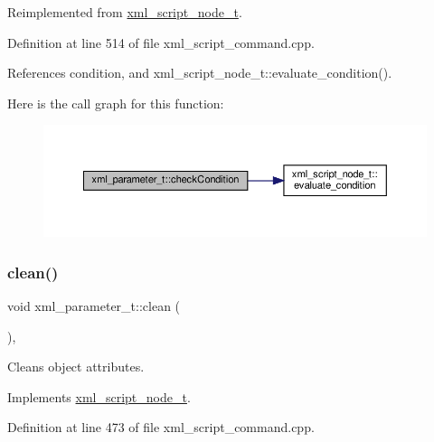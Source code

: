 Reimplemented from \hyperlink{classxml__script__node__t_a13fbe7caa7bed64ab3cc25d51392523d}{xml\+\_\+script\+\_\+node\+\_\+t}.



Definition at line 514 of file xml\+\_\+script\+\_\+command.\+cpp.



References condition, and xml\+\_\+script\+\_\+node\+\_\+t\+::evaluate\+\_\+condition().

Here is the call graph for this function\+:
\nopagebreak
\begin{figure}[H]
\begin{center}
\leavevmode
\includegraphics[width=350pt]{d4/dfd/classxml__parameter__t_a3ba5d8470dadb8afd334dfbaba43c05f_cgraph}
\end{center}
\end{figure}
\mbox{\label{classxml__parameter__t_a9fc1880ab4a4e6e4caa97f9f858c4c2e}} 
\subsubsection{\texorpdfstring{clean()}{clean()}}
{\footnotesize\ttfamily void xml\+\_\+parameter\+\_\+t\+::clean (\begin{DoxyParamCaption}{ }\end{DoxyParamCaption})\hspace{0.3cm}{\ttfamily [override]}, {\ttfamily [virtual]}}



Cleans object attributes. 



Implements \hyperlink{classxml__script__node__t_a2be778f2caef531c55b36c2bf2c996e2}{xml\+\_\+script\+\_\+node\+\_\+t}.



Definition at line 473 of file xml\+\_\+script\+\_\+command.\+cpp.




